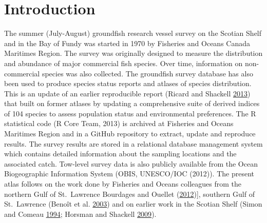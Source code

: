 \documentclass[12pt]{article}\usepackage[]{graphicx}\usepackage[]{color}
\begin{document}

\frontmatter


\renewcommand{\headrulewidth}{0.5pt}  %
\renewcommand{\footrulewidth}{0.5pt}  %


\section{Introduction}\label{sec:introduction}

The summer (July-August) groundfish research vessel survey on the Scotian Shelf and in the Bay of Fundy was started in 1970 by Fisheries and Oceans Canada Maritimes Region. The survey was originally designed to measure the distribution and abundance of major commercial fish species. Over time, information on non-commercial species was also collected. The groundfish survey database has also been used to produce species status reports and atlases of species distribution. This is an update of an earlier reproducible report (Ricard and Shackell \protect\hyperlink{ref-Ricard:MARatlas:2013}{2013}) that built on former atlases by updating a comprehensive suite of derived indices of 104 species to assess population status and environmental preferences. The R statistical code (R Core Team, 2013) is archived at Fisheries and Oceans Maritimes Region and in a GitHub repository to extract, update and reproduce results. The survey results are stored in a relational database management system which contains detailed information about the sampling locations and the associated catch. Tow-level survey data is also publicly available from the Ocean Biogeographic Information System (OBIS, UNESCO/IOC (2012)). The present atlas follows on the work done by Fisheries and Oceans colleagues from the northern Gulf of St.~Lawrence Bourdages and Ouellet (\protect\hyperlink{ref-Bourdages:NGatlas:2012}{2012}){]}, southern Gulf of St.~Lawrence (Benoît et al. \protect\hyperlink{ref-Benoit:etal:2003:techreport}{2003}) and on earlier work in the Scotian Shelf (Simon and Comeau \protect\hyperlink{ref-Simon:Comeau:1994}{1994}; Horsman and Shackell \protect\hyperlink{ref-Horsman:atlas:2009}{2009}).
\end{document}

